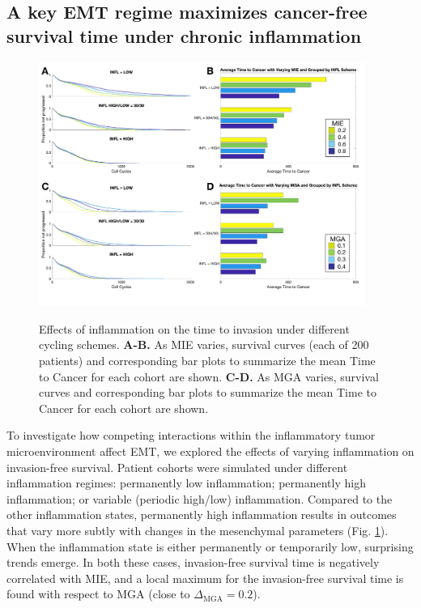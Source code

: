 \documentclass[11pt]{article}
\begin{document}





\subsection{A key EMT regime maximizes cancer-free survival time under chronic inflammation}\label{KeyEMT}

\begin{figure}
\center
{\includegraphics[width=0.95\textwidth]{Figure4/Figure4.pdf}}
\caption{Effects of inflammation on the time to invasion under different cycling schemes. {\bf A-B.} As MIE varies, survival curves (each of 200 patients)  and corresponding bar plots to summarize the mean Time to Cancer for each cohort are shown. {\bf C-D.} As MGA varies, survival curves  and corresponding bar plots to summarize the mean Time to Cancer for each cohort are shown.}
\label{fig:VaryINFL_and_MesPars}
\end{figure}


To investigate how competing interactions within the inflammatory tumor microenvironment affect EMT, we explored the effects of varying inflammation on invasion-free survival. Patient cohorts were simulated under different inflammation regimes: permanently low inflammation; permanently high inflammation; or variable (periodic high/low) inflammation. 
Compared to the other inflammation states, permanently high inflammation results in outcomes that vary more subtly with changes in the mesenchymal parameters (Fig. \ref{fig:VaryINFL_and_MesPars}).
When the inflammation state is either permanently or temporarily low, surprising trends emerge. In both these cases, invasion-free survival time is negatively correlated with MIE, and a local maximum for the invasion-free survival time is found with respect to MGA (close to $\Delta_\text{MGA}= 0.2$).
\end{document}
